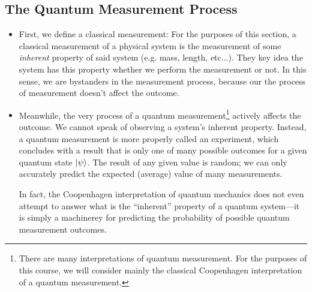 \documentclass[11pt, a4paper]{article}
\begin{document}
\subsection{The Quantum Measurement Process}
\begin{itemize}
    \item First, we define a classical measurement: For the purposes of this section, a classical measurement of a physical system is the measurement of some \textit{inherent} property of said system (e.g. mass, length, etc...). They key idea the system has this property whether we perform the measurement or not. In this sense, we are bystanders in the measurement process, because our the process of measurement doesn't affect the outcome.

    \item Meanwhile, the very process of a quantum measurement\footnote{There are many interpretations of quantum measurement. For the purposes of this course, we will consider mainly the classical Coopenhagen interpretation of a quantum measurement.} actively affects the outcome. We cannot speak of observing a system's inherent property. Instead, a quantum measurement is more properly called an experiment, which concludes with a result that is only one of many possible outcomes for a given quantum state $ \ket{\psi} $. The result of any given value is random; we can only accurately predict the expected (average) value of many measurements.

    In fact, the Coopenhagen interpretation of quantum mechanics does not even attempt to answer what is the ``inherent'' property of a quantum system---it is simply a machinerey for predicting the probability of possible quantum measurement outcomes.
    
\end{itemize}
\end{document}
